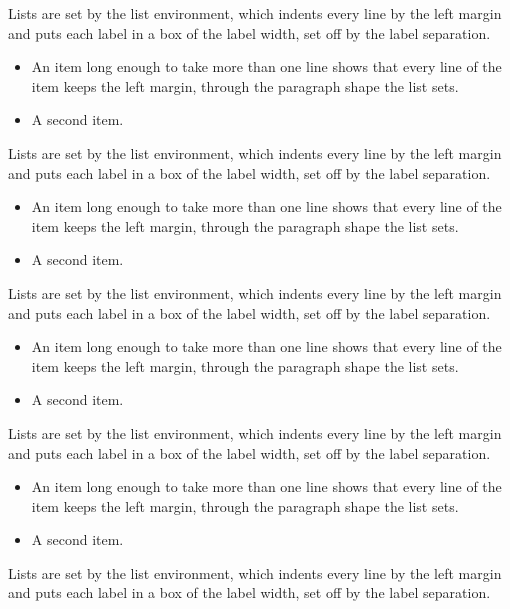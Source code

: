 \documentclass[12pt]{book}
\begin{document}
Lists are set by the list environment, which indents every line by the left margin and puts each label in a box of the label width, set off by the label separation.

\begin{itemize}
\item An item long enough to take more than one line shows that every line of the item keeps the left margin, through the paragraph shape the list sets.
\item A second item.
\end{itemize}

Lists are set by the list environment, which indents every line by the left margin and puts each label in a box of the label width, set off by the label separation.

\begin{itemize}
\item An item long enough to take more than one line shows that every line of the item keeps the left margin, through the paragraph shape the list sets.
\item A second item.
\end{itemize}

Lists are set by the list environment, which indents every line by the left margin and puts each label in a box of the label width, set off by the label separation.

\begin{itemize}
\item An item long enough to take more than one line shows that every line of the item keeps the left margin, through the paragraph shape the list sets.
\item A second item.
\end{itemize}

Lists are set by the list environment, which indents every line by the left margin and puts each label in a box of the label width, set off by the label separation.

\begin{itemize}
\item An item long enough to take more than one line shows that every line of the item keeps the left margin, through the paragraph shape the list sets.
\item A second item.
\end{itemize}

Lists are set by the list environment, which indents every line by the left margin and puts each label in a box of the label width, set off by the label separation.
\end{document}
